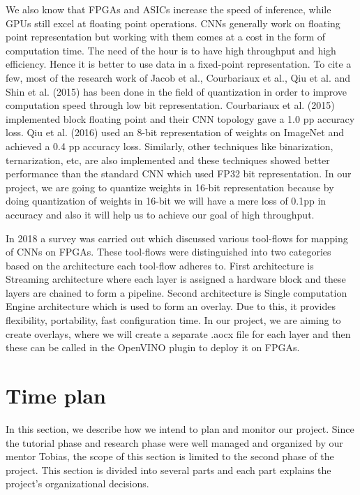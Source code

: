 \documentclass[titlepage]{report}
\begin{document}
We also know that FPGAs and ASICs increase the speed of inference, while GPUs still excel at floating point operations. CNNs generally work on floating point representation but working with them comes at a cost in the form of computation time. The need of the hour is to have high throughput and high efficiency. Hence it is better to use data in a fixed-point representation. To cite a few, most of the research work of Jacob et al., Courbariaux et al., Qiu et al. and Shin et al. (2015) has been done in the field of quantization in order to improve computation speed through low bit representation. Courbariaux et al. (2015) implemented block floating point and their CNN topology gave a 1.0 pp accuracy loss. Qiu et al. (2016) used an 8-bit representation of weights on ImageNet and achieved a 0.4 pp accuracy loss. Similarly, other techniques like binarization, ternarization, etc, are also implemented and these techniques showed better performance than the standard CNN which used FP32 bit representation. In our project, we are going to quantize weights in 16-bit representation because by doing quantization of weights in 16-bit we will have a mere loss of 0.1pp in accuracy and also it will help us to achieve our goal of high throughput.

In 2018 a survey was carried out which discussed various tool-flows for mapping of CNNs on FPGAs. These tool-flows were distinguished into two categories based on the architecture each tool-flow adheres to. First architecture is Streaming architecture where each layer is assigned a hardware block and these layers are chained to form a pipeline. Second architecture is Single computation Engine architecture which is used to form an overlay. Due to this, it provides flexibility, portability, fast configuration time. In our project, we are aiming to create overlays, where we will create a separate .aocx file for each layer and then these can be called in the OpenVINO plugin to deploy it on FPGAs.



\chapter{Time plan}
In this section, we describe how we intend to plan and monitor our project. Since the tutorial phase and research phase were well managed and organized by our mentor Tobias, the scope of this section is limited to the second phase of the project. This section is divided into several parts and each part explains the project’s organizational decisions. 
\end{document}
